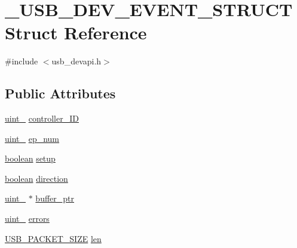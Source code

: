 \hypertarget{struct___u_s_b___d_e_v___e_v_e_n_t___s_t_r_u_c_t}{}\section{\+\_\+\+U\+S\+B\+\_\+\+D\+E\+V\+\_\+\+E\+V\+E\+N\+T\+\_\+\+S\+T\+R\+U\+CT Struct Reference}
\label{struct___u_s_b___d_e_v___e_v_e_n_t___s_t_r_u_c_t}


{\ttfamily \#include $<$usb\+\_\+devapi.\+h$>$}

\subsection*{Public Attributes}
\begin{DoxyCompactItemize}
\item 
\hyperlink{types_8h_ad3209046c23f739a81581c10a4be7d92}{uint\+\_} \hyperlink{struct___u_s_b___d_e_v___e_v_e_n_t___s_t_r_u_c_t_a059c84bf996d1ac97b7af0ef69898142}{controller\+\_\+\+ID}
\item 
\hyperlink{types_8h_ad3209046c23f739a81581c10a4be7d92}{uint\+\_} \hyperlink{struct___u_s_b___d_e_v___e_v_e_n_t___s_t_r_u_c_t_a921dcd3bdebe23c6aec467f007d743f6}{ep\+\_\+num}
\item 
\hyperlink{types_8h_a7670a4e8a07d9ebb00411948b0bbf86d}{boolean} \hyperlink{struct___u_s_b___d_e_v___e_v_e_n_t___s_t_r_u_c_t_a0054be8f64b8700f301fd236eda4aa6f}{setup}
\item 
\hyperlink{types_8h_a7670a4e8a07d9ebb00411948b0bbf86d}{boolean} \hyperlink{struct___u_s_b___d_e_v___e_v_e_n_t___s_t_r_u_c_t_a262de900fc012e7ee46ef080f8065b47}{direction}
\item 
\hyperlink{types_8h_ad3209046c23f739a81581c10a4be7d92}{uint\+\_} $\ast$ \hyperlink{struct___u_s_b___d_e_v___e_v_e_n_t___s_t_r_u_c_t_af596c364e0f21b18967b4674f135b69d}{buffer\+\_\+ptr}
\item 
\hyperlink{types_8h_ad3209046c23f739a81581c10a4be7d92}{uint\+\_} \hyperlink{struct___u_s_b___d_e_v___e_v_e_n_t___s_t_r_u_c_t_a4e8a27a4b499bfc2c73e98f1dfa5563d}{errors}
\item 
\hyperlink{user__config_8h_a6e29b9c6856f378f54cd7f0a9a7ec910}{U\+S\+B\+\_\+\+P\+A\+C\+K\+E\+T\+\_\+\+S\+I\+ZE} \hyperlink{struct___u_s_b___d_e_v___e_v_e_n_t___s_t_r_u_c_t_a45a1bf1a753b59a66d6573c3762c98c3}{len}
\end{DoxyCompactItemize}


